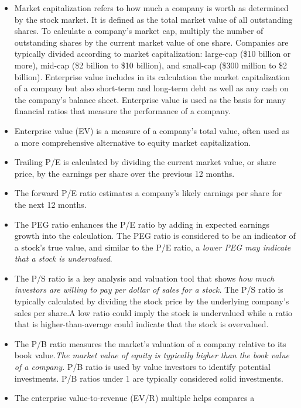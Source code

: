 \documentclass[
]{article}
\providecommand{\tightlist}{%
  \setlength{\itemsep}{0pt}\setlength{\parskip}{0pt}}
\begin{document}
\begin{itemize}
\tightlist
\item
  Market capitalization refers to how much a company is worth as
  determined by the stock market. It is defined as the total market
  value of all outstanding shares. To calculate a company's market cap,
  multiply the number of outstanding shares by the current market value
  of one share. Companies are typically divided according to market
  capitalization: large-cap (\$10 billion or more), mid-cap (\$2 billion
  to \$10 billion), and small-cap (\$300 million to \$2 billion).
  Enterprise value includes in its calculation the market capitalization
  of a company but also short-term and long-term debt as well as any
  cash on the company's balance sheet. Enterprise value is used as the
  basis for many financial ratios that measure the performance of a
  company.
\item
  Enterprise value (EV) is a measure of a company's total value, often
  used as a more comprehensive alternative to equity market
  capitalization.
\item
  Trailing P/E is calculated by dividing the current market value, or
  share price, by the earnings per share over the previous 12 months.
\item
  The forward P/E ratio estimates a company's likely earnings per share
  for the next 12 months.
\item
  The PEG ratio enhances the P/E ratio by adding in expected earnings
  growth into the calculation. The PEG ratio is considered to be an
  indicator of a stock's true value, and similar to the P/E ratio, a
  \emph{lower PEG may indicate that a stock is undervalued}.
\item
  The P/S ratio is a key analysis and valuation tool that shows
  \emph{how much investors are willing to pay per dollar of sales for a
  stock.} The P/S ratio is typically calculated by dividing the stock
  price by the underlying company's sales per share.A low ratio could
  imply the stock is undervalued while a ratio that is
  higher-than-average could indicate that the stock is overvalued.
\item
  The P/B ratio measures the market's valuation of a company relative to
  its book value.\emph{The market value of equity is typically higher
  than the book value of a company.} P/B ratio is used by value
  investors to identify potential investments. P/B ratios under 1 are
  typically considered solid investments.
\item
  The enterprise value-to-revenue (EV/R) multiple helps compares a

\end{itemize}
\end{document}
